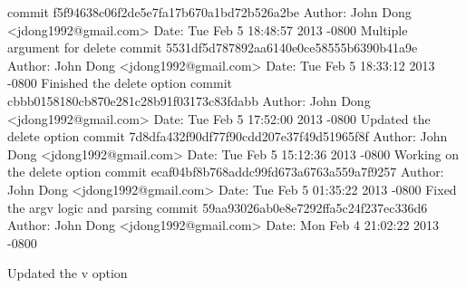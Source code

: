 \documentclass[letterpaper,10pt,titlepage]{article}
\begin{document}
commit f5f94638c06f2de5e7fa17b670a1bd72b526a2be \newline
Author: John Dong <jdong1992@gmail.com> \newline
Date:   Tue Feb 5 18:48:57 2013 -0800 \newline
\newline
    Multiple argument for delete \newline
\newline
commit 5531df5d787892aa6140e0ce58555b6390b41a9e \newline
Author: John Dong <jdong1992@gmail.com>\newline
Date:   Tue Feb 5 18:33:12 2013 -0800\newline
\newline
    Finished the delete option\newline
\newline
commit cbbb0158180cb870e281c28b91f03173c83fdabb\newline
Author: John Dong <jdong1992@gmail.com>\newline
Date:   Tue Feb 5 17:52:00 2013 -0800\newline
\newline
    Updated the delete option\newline
\newline
commit 7d8dfa432f90df77f90cdd207e37f49d51965f8f\newline
Author: John Dong <jdong1992@gmail.com>\newline
Date:   Tue Feb 5 15:12:36 2013 -0800\newline
\newline
    Working on the delete option\newline
\newline
commit ecaf04bf8b768addc99fd673a6763a559a7f9257\newline
Author: John Dong <jdong1992@gmail.com>\newline
Date:   Tue Feb 5 01:35:22 2013 -0800\newline
\newline
    Fixed the argv logic and parsing\newline
\newline
commit 59aa93026ab0e8e7292ffa5c24f237ec336d6
Author: John Dong <jdong1992@gmail.com>\newline
Date:   Mon Feb 4 21:02:22 2013 -0800\newline

    Updated the v option\newline
\end{document}
